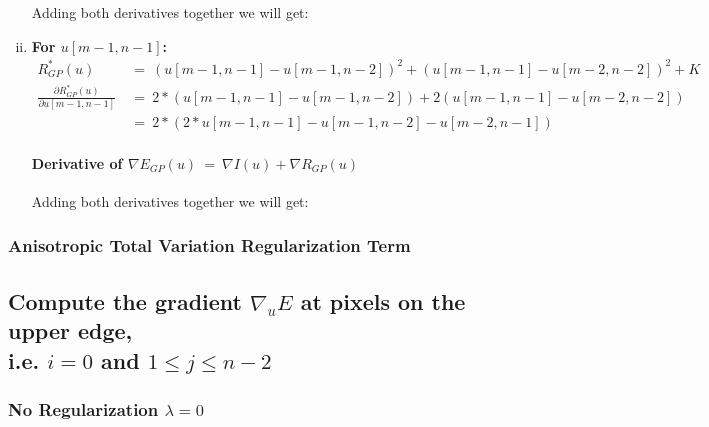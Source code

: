 \documentclass{report}
\begin{document}
\begin{enumerate}[(i)]
						\startsubsection
							Adding both derivatives together we will get:
						\closesection
						\item \textbf{For $u[m-1,n-1]$:}
						\begin{align*}
							R_{GP}^*(u) \ & = \ (u[m-1,n-1] - u[m-1,n-2])^2 + (u[m-1,n-1] - u[m-2,n-2])^2 + K \\
							\frac{\partial R_{GP}^*(u)}{\partial u[m-1,n-1]} \ & = \ 2 * (u[m-1,n-1] - u[m-1,n-2]) + 2 (u[m-1,n-1] - u[m-2,n-2]) \\
							& = \ 2 * (2 * u[m-1,n-1] - u[m-1,n-2] - u[m-2,n-1])
						\end{align*}
						\vspace{-0.4cm} \paragraph{Derivative of $\nabla E_{GP}(u) \ = \ \nabla I(u) + \nabla R_{GP}(u)$}
						\startsubsection
							Adding both derivatives together we will get:
						\closesection
					\end{enumerate}
				\closesection
			\closesection
			\subsubsection{Anisotropic Total Variation Regularization Term}
			\startsubsection
			\closesection
		\closesection
		\subsection{Compute the gradient $\nabla_u E$ at pixels on the upper edge, \\ i.e. $i = 0$ and $1 \leq j \leq n-2$}
		\startsubsection
			\subsubsection{No Regularization $\lambda = 0$}
			\startsubsection
			\closesection
\end{document}
